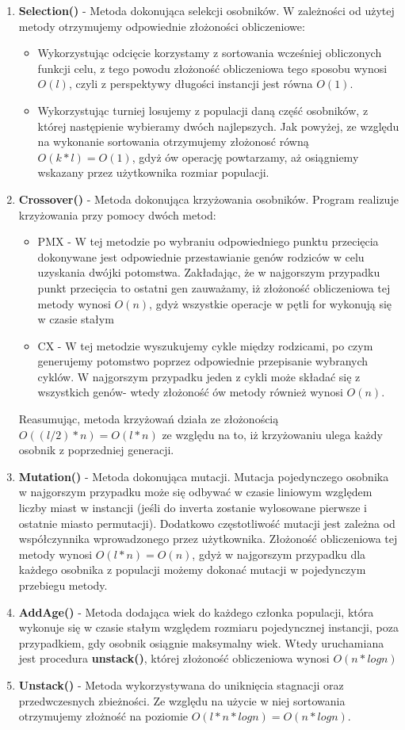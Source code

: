 \begin{enumerate}
    \item \textbf{Selection()} - Metoda dokonująca selekcji osobników. W zależności od użytej metody otrzymujemy odpowiednie złożoności obliczeniowe:
    \begin{itemize}
      \item  Wykorzystując odcięcie korzystamy z sortowania wcześniej obliczonych funkcji celu, z tego powodu złożoność obliczeniowa tego sposobu wynosi $O(l)$, czyli z perspektywy długości instancji jest równa $O(1)$.
      \item Wykorzystując turniej losujemy z populacji daną część osobników, z której następienie wybieramy dwóch najlepszych. Jak powyżej, ze względu na wykonanie sortowania otrzymujemy złożonosć równą $O(k*l) = O(1)$, gdyż ów operację powtarzamy, aż osiągniemy wskazany przez użytkownika rozmiar populacji.
    \end{itemize}
    \item \textbf{Crossover()} - Metoda dokonująca krzyżowania osobników. Program realizuje krzyżowania przy pomocy dwóch metod:
    \begin{itemize}
      \item PMX - W tej metodzie po wybraniu odpowiedniego punktu przecięcia dokonywane jest odpowiednie przestawianie genów rodziców w celu uzyskania dwójki potomstwa. Zakładając, że w najgorszym przypadku
      punkt przecięcia to ostatni gen zauważamy, iż złożoność obliczeniowa tej metody wynosi $O(n)$, gdyż wszystkie operacje w pętli for wykonują się w czasie stałym
      \item CX - W tej metodzie wyszukujemy cykle między rodzicami, po czym generujemy potomstwo poprzez odpowiednie przepisanie wybranych cyklów. W najgorszym przypadku jeden z cykli może składać się z wszystkich genów- wtedy złożoność ów metody również wynosi $O(n)$.
    \end{itemize}
    Reasumując, metoda krzyżowań działa ze złożonością $O((l/2)*n) = O(l*n)$ ze względu na to, iż krzyżowaniu ulega każdy osobnik z poprzedniej generacji.
    \item \textbf{Mutation()} - Metoda dokonująca mutacji. Mutacja pojedynczego osobnika w najgorszym przypadku może się odbywać w czasie liniowym względem liczby miast w instancji (jeśli do inverta zostanie wylosowane pierwsze i ostatnie miasto permutacji). Dodatkowo częstotliwość mutacji jest zależna od współczynnika wprowadzonego przez użytkownika.
    Złożoność obliczeniowa tej metody wynosi $O(l*n) = O(n)$, gdyż w najgorszym przypadku dla każdego osobnika z populacji możemy dokonać mutacji w pojedynczym przebiegu metody.
    \item \textbf{AddAge()} - Metoda dodająca wiek do każdego członka populacji, która wykonuje się w czasie stałym względem rozmiaru pojedyncznej instancji, poza przypadkiem, gdy osobnik osiągnie maksymalny wiek. Wtedy uruchamiana jest procedura \textbf{unstack()}, której złożoność obliczeniowa wynosi $O(n*logn)$
    \item \textbf{Unstack()} - Metoda wykorzystywana do uniknięcia stagnacji oraz przedwczesnych zbieżności. Ze względu na użycie w niej sortowania otrzymujemy złożność na poziomie $O(l*n*logn) = O(n*logn)$.

  \end{enumerate}
